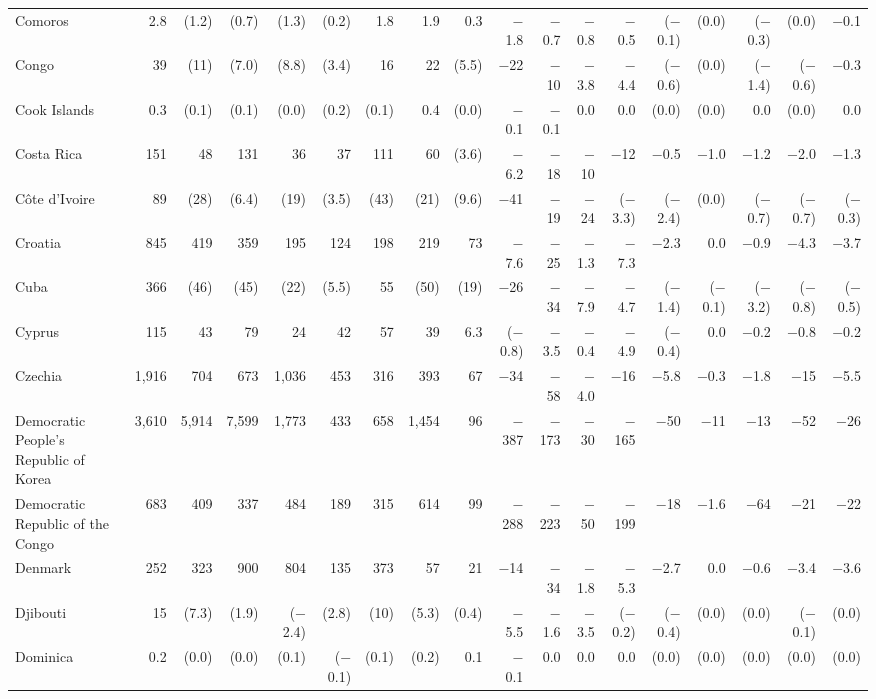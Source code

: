 \begin{longtable}{lrrrrrrrrrrrrrrrrr}
Comoros & 2.8 & (1.2) & (0.7) & (1.3) & (0.2) & 1.8 & 1.9 & 0.3 & $-$1.8 & $-$0.7 & $-$0.8 & $-$0.5 & ($-$0.1) & (0.0) & ($-$0.3) & (0.0) & $-$0.1 \\
Congo & 39 & (11) & (7.0) & (8.8) & (3.4) & 16 & 22 & (5.5) & $-$22 & $-$10 & $-$3.8 & $-$4.4 & ($-$0.6) & (0.0) & ($-$1.4) & ($-$0.6) & $-$0.3 \\
Cook Islands & 0.3 & (0.1) & (0.1) & (0.0) & (0.2) & (0.1) & 0.4 & (0.0) & $-$0.1 & $-$0.1 & 0.0 & 0.0 & (0.0) & (0.0) & 0.0 & (0.0) & 0.0 \\
Costa Rica & 151 & 48 & 131 & 36 & 37 & 111 & 60 & (3.6) & $-$6.2 & $-$18 & $-$10 & $-$12 & $-$0.5 & $-$1.0 & $-$1.2 & $-$2.0 & $-$1.3 \\
Côte d'Ivoire & 89 & (28) & (6.4) & (19) & (3.5) & (43) & (21) & (9.6) & $-$41 & $-$19 & $-$24 & ($-$3.3) & ($-$2.4) & (0.0) & ($-$0.7) & ($-$0.7) & ($-$0.3) \\
Croatia & 845 & 419 & 359 & 195 & 124 & 198 & 219 & 73 & $-$7.6 & $-$25 & $-$1.3 & $-$7.3 & $-$2.3 & 0.0 & $-$0.9 & $-$4.3 & $-$3.7 \\
Cuba & 366 & (46) & (45) & (22) & (5.5) & 55 & (50) & (19) & $-$26 & $-$34 & $-$7.9 & $-$4.7 & ($-$1.4) & ($-$0.1) & ($-$3.2) & ($-$0.8) & ($-$0.5) \\
Cyprus & 115 & 43 & 79 & 24 & 42 & 57 & 39 & 6.3 & ($-$0.8) & $-$3.5 & $-$0.4 & $-$4.9 & ($-$0.4) & 0.0 & $-$0.2 & $-$0.8 & $-$0.2 \\
Czechia & 1,916 & 704 & 673 & 1,036 & 453 & 316 & 393 & 67 & $-$34 & $-$58 & $-$4.0 & $-$16 & $-$5.8 & $-$0.3 & $-$1.8 & $-$15 & $-$5.5 \\
Democratic People's Republic of Korea & 3,610 & 5,914 & 7,599 & 1,773 & 433 & 658 & 1,454 & 96 & $-$387 & $-$173 & $-$30 & $-$165 & $-$50 & $-$11 & $-$13 & $-$52 & $-$26 \\
Democratic Republic of the Congo & 683 & 409 & 337 & 484 & 189 & 315 & 614 & 99 & $-$288 & $-$223 & $-$50 & $-$199 & $-$18 & $-$1.6 & $-$64 & $-$21 & $-$22 \\
Denmark & 252 & 323 & 900 & 804 & 135 & 373 & 57 & 21 & $-$14 & $-$34 & $-$1.8 & $-$5.3 & $-$2.7 & 0.0 & $-$0.6 & $-$3.4 & $-$3.6 \\
Djibouti & 15 & (7.3) & (1.9) & ($-$2.4) & (2.8) & (10) & (5.3) & (0.4) & $-$5.5 & $-$1.6 & $-$3.5 & ($-$0.2) & ($-$0.4) & (0.0) & (0.0) & ($-$0.1) & (0.0) \\
Dominica & 0.2 & (0.0) & (0.0) & (0.1) & ($-$0.1) & (0.1) & (0.2) & 0.1 & $-$0.1 & 0.0 & 0.0 & 0.0 & (0.0) & (0.0) & (0.0) & (0.0) & (0.0) \\

\end{longtable}
